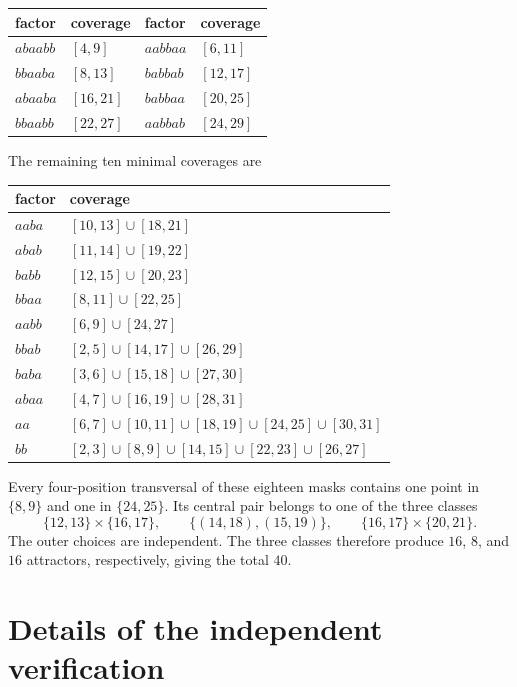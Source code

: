 \documentclass[11pt,a4paper]{article}
\theoremstyle{definition}\newtheorem{definition}[theorem]{Definition}
\theoremstyle{remark}\newtheorem{remark}[theorem]{Remark}
\begin{document}
\begin{center}
\begin{tabular}{ll@{\qquad}ll}
\toprule
factor & coverage & factor & coverage\\
\midrule
$abaabb$ & $[4,9]$ & $aabbaa$ & $[6,11]$\\
$bbaaba$ & $[8,13]$ & $babbab$ & $[12,17]$\\
$abaaba$ & $[16,21]$ & $babbaa$ & $[20,25]$\\
$bbaabb$ & $[22,27]$ & $aabbab$ & $[24,29]$\\
\bottomrule
\end{tabular}
\end{center}

The remaining ten minimal coverages are

\begin{center}
\begin{tabular}{ll}
\toprule
factor & coverage\\
\midrule
$aaba$ & $[10,13]\cup[18,21]$\\
$abab$ & $[11,14]\cup[19,22]$\\
$babb$ & $[12,15]\cup[20,23]$\\
$bbaa$ & $[8,11]\cup[22,25]$\\
$aabb$ & $[6,9]\cup[24,27]$\\
$bbab$ & $[2,5]\cup[14,17]\cup[26,29]$\\
$baba$ & $[3,6]\cup[15,18]\cup[27,30]$\\
$abaa$ & $[4,7]\cup[16,19]\cup[28,31]$\\
$aa$ & $[6,7]\cup[10,11]\cup[18,19]\cup[24,25]\cup[30,31]$\\
$bb$ & $[2,3]\cup[8,9]\cup[14,15]\cup[22,23]\cup[26,27]$\\
\bottomrule
\end{tabular}
\end{center}

Every four-position transversal of these eighteen masks contains one point in $\{8,9\}$ and one in $\{24,25\}$.  Its central pair belongs to one of the three classes
\[
 \{12,13\}\times\{16,17\},
 \qquad
 \{(14,18),(15,19)\},
 \qquad
 \{16,17\}\times\{20,21\}.
\]
The outer choices are independent.  The three classes therefore produce $16$, $8$, and $16$ attractors, respectively, giving the total $40$.


\section{Details of the independent verification}
\label{app:independent-verification}
\end{document}

